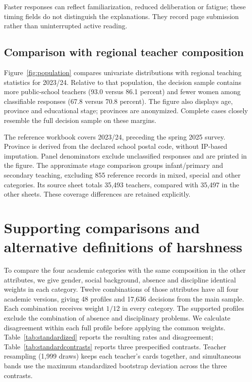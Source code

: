 Faster responses can reflect familiarization, reduced deliberation or fatigue; these timing fields do not distinguish the explanations. They record page submission rather than uninterrupted active reading.

\subsection{Comparison with regional teacher composition}
Figure~\ref{fig:population} compares univariate distributions with regional teaching statistics for 2023/24. Relative to that population, the decision sample contains more public-school teachers (93.0 versus 86.1 percent) and fewer women among classifiable responses (67.8 versus 70.8 percent). The figure also displays age, province and educational stage; provinces are anonymized. Complete cases closely resemble the full decision sample on these margins.

The reference workbook covers 2023/24, preceding the spring 2025 survey. Province is derived from the declared school postal code, without IP-based imputation. Panel denominators exclude unclassified responses and are printed in the figure. The approximate stage comparison groups infant/primary and secondary teaching, excluding 855 reference records in mixed, special and other categories. Its source sheet totals 35,493 teachers, compared with 35,497 in the other sheets. These coverage differences are retained explicitly.

\color{reused}
\section{Supporting comparisons and alternative definitions of harshness}\label{app:harshness}
To compare the four academic categories with the same composition in the other attributes, we give gender, social background, absence and discipline identical weights in each category. Twelve combinations of those attributes have all four academic versions, giving 48 profiles and 17,636 decisions from the main sample. Each combination receives weight $1/12$ in every category. The supported profiles exclude the combination of absence and disciplinary problems. We calculate disagreement within each full profile before applying the common weights. Table~\ref{tab:standardized} reports the resulting rates and disagreement; Table~\ref{tab:standardcontrasts} reports three prespecified contrasts. Teacher resampling (1,999 draws) keeps each teacher's cards together, and simultaneous bands use the maximum standardized bootstrap deviation across the three contrasts.
\FloatBarrier

